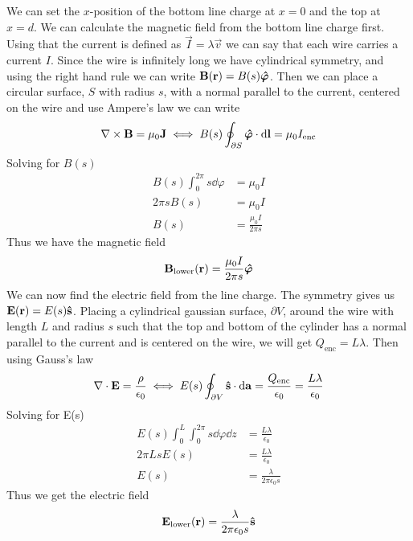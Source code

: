 We can set the $x$-position of the bottom line charge at $x = 0$ and the top at $x = d$. We can calculate the magnetic field from the bottom line charge first. Using that the current is defined as $\vec{I} = \lambda \vec{v}$ we can say that each wire carries a current $I$. Since the wire is infinitely long we have cylindrical symmetry, and using the right hand rule we can write $\bm{\mathrm{B}}(\bm{\mathrm{r}}) = B(s)\bm{\mathrm{\hat{\varphi}}}$. Then we can place a circular surface, $S$ with radius $s$, with a normal parallel to the current, centered on the wire and use Ampere's law we can write
\begin{equation}
    \nabla \times \bm{\mathrm{B}} = \mu_0 \bm{\mathrm{J}} 
    \iff
     B(s)\oint_{\partial S} \bm{\mathrm{\hat{\varphi}}} \cdot \dd \bm{\mathrm{l}} = \mu_0 I_\text{enc}
\end{equation}
Solving for $B(s)$
\begin{align}
    B(s) \int_{0}^{2\pi} s \dd \varphi &= \mu_0 I\\
    2\pi s B(s) &= \mu_0 I\\
    B(s) &= \frac{\mu_0 I}{2\pi s}
\end{align}
Thus we have the magnetic field
\begin{equation}
    \bm{\mathrm{B}}_\text{lower}(\bm{\mathrm{r}}) = \frac{\mu_0 I}{2\pi s} \bm{\mathrm{\hat{\varphi}}}
\end{equation}
We can now find the electric field from the line charge. The symmetry gives us $\bm{\mathrm{E}}(\bm{\mathrm{r}}) = E(s) \bm{\mathrm{\hat{s}}}$. Placing a cylindrical gaussian surface, $\partial V$, around the wire with length $L$ and radius $s$ such that the top and bottom of the cylinder has a normal parallel to the current and is centered on the wire, we will get $Q_\text{enc} = L \lambda$. Then using Gauss's law
\begin{equation}
    \nabla \cdot \bm{\mathrm{E}} = \frac{\rho}{\epsilon_0} 
    \iff
    E(s) \oint_{\partial V} \bm{\mathrm{\hat{s}}} \cdot \dd \bm{\mathrm{a}}= \frac{Q_\text{enc}}{\epsilon_0} = \frac{L\lambda}{\epsilon_0}
\end{equation}
Solving for E(s)
\begin{align}
    E(s)\int_{0}^{L}\int_{0}^{2\pi}s\dd \varphi \dd z &= \frac{L\lambda}{\epsilon_0}\\
    2\pi L s E(s) &= \frac{L\lambda}{\epsilon_0}\\
    E(s) &= \frac{\lambda}{2\pi \epsilon_0 s}
\end{align}
Thus we get the electric field
\begin{equation}
    \bm{\mathrm{E}}_\text{lower}(\bm{\mathrm{r}}) = \frac{\lambda}{2\pi \epsilon_0 s} \bm{\mathrm{\hat{s}}}
\end{equation}
